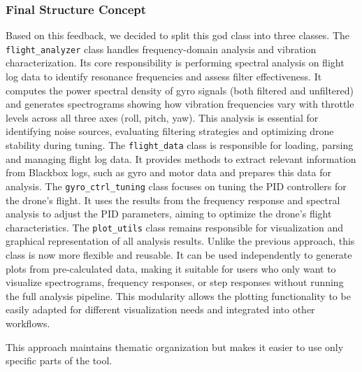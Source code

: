 \documentclass[a4paper,11pt]{scrartcl}
\begin{document}
\subsubsection*{Final Structure Concept}
Based on this feedback, we decided to split this god class into three classes.
The \texttt{flight\_analyzer} class handles frequency-domain analysis and vibration characterization.
Its core responsibility is performing spectral analysis on flight log data to identify resonance frequencies and assess filter effectiveness.
It computes the power spectral density of gyro signals (both filtered and unfiltered) and generates spectrograms showing
how vibration frequencies vary with throttle levels across all three axes (roll, pitch, yaw).
This analysis is essential for identifying noise sources, evaluating filtering strategies and optimizing drone stability during tuning.
The \texttt{flight\_data} class is responsible for loading, parsing and managing flight log data.
It provides methods to extract relevant information from Blackbox logs, such as gyro and motor data and prepares this data for analysis.
The \texttt{gyro\_ctrl\_tuning} class focuses on tuning the PID controllers for the drone's flight.
It uses the results from the frequency response and spectral analysis to adjust the PID parameters, aiming to optimize the drone's flight characteristics.
The \texttt{plot\_utils} class remains responsible for visualization and graphical representation of all analysis results.
Unlike the previous approach, this class is now more flexible and reusable. It can be used independently to generate plots from pre-calculated data,
making it suitable for users who only want to visualize spectrograms, frequency responses, or step responses without running the full analysis pipeline.
This modularity allows the plotting functionality to be easily adapted for different visualization needs and integrated into other workflows.

\clearpage

This approach maintains thematic organization but makes it easier to use only specific parts of the tool.

\end{document}

